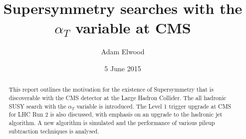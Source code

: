 

\title{Supersymmetry searches with the $\alpha_T$ variable at CMS}
\date{5 June 2015}
\author{Adam Elwood}

\maketitle        
        
\begin{abstract}
  \noindent
 This report outlines the motivation for the existence of Supersymmetry that is discoverable with the CMS detector at the Large Hadron Collider. The all hadronic SUSY search with the $\alpha_T$ variable is introduced. The Level 1 trigger upgrade at CMS for LHC Run 2 is also discussed, with emphasis on an upgrade to the hadronic jet algorithm. A new algorithm is simulated and the performance of various pileup subtraction techniques is analysed.
\end{abstract}












